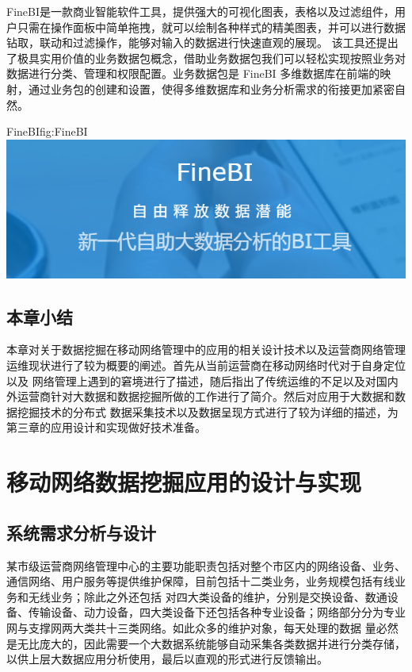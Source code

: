 \documentclass{HustGraduPaper}
\begin{document}
    FineBI是一款商业智能软件工具，提供强大的可视化图表，表格以及过滤组件，用户只需在操作面板中简单拖拽，就可以绘制各种样式的精美图表，并可以进行数据钻取，联动和过滤操作，能够对输入的数据进行快速直观的展现。
    该工具还提出了极具实用价值的业务数据包概念，借助业务数据包我们可以轻松实现按照业务对数据进行分类、管理和权限配置。业务数据包是 FineBI 多维数据库在前端的映射，通过业务包的创建和设置，使得多维数据库和业务分析需求的衔接更加紧密自然。
    \begin{generalfig}[htb]{FineBI}{fig:FineBI} 
        \includegraphics[scale = 0.4]{Figures/FineBI.png}
    \end{generalfig}

    \subsection{本章小结}
    本章对关于数据挖掘在移动网络管理中的应用的相关设计技术以及运营商网络管理运维现状进行了较为概要的阐述。首先从当前运营商在移动网络时代对于自身定位以及
    网络管理上遇到的窘境进行了描述，随后指出了传统运维的不足以及对国内外运营商针对大数据和数据挖掘所做的工作进行了简介。然后对应用于大数据和数据挖掘技术的分布式
    数据采集技术以及数据呈现方式进行了较为详细的描述，为第三章的应用设计和实现做好技术准备。
    \clearpage

    \section{移动网络数据挖掘应用的设计与实现}
    \subsection{系统需求分析与设计}
    某市级运营商网络管理中心的主要功能职责包括对整个市区内的网络设备、业务、通信网络、用户服务等提供维护保障，目前包括十二类业务，业务规模包括有线业务和无线业务；除此之外还包括
    对四大类设备的维护，分别是交换设备、数通设备、传输设备、动力设备，四大类设备下还包括各种专业设备；网络部分分为专业网与支撑网两大类共十三类网络。如此众多的维护对象，每天处理的数据
    量必然是无比庞大的，因此需要一个大数据系统能够自动采集各类数据并进行分类存储，以供上层大数据应用分析使用，最后以直观的形式进行反馈输出。
\end{document}
